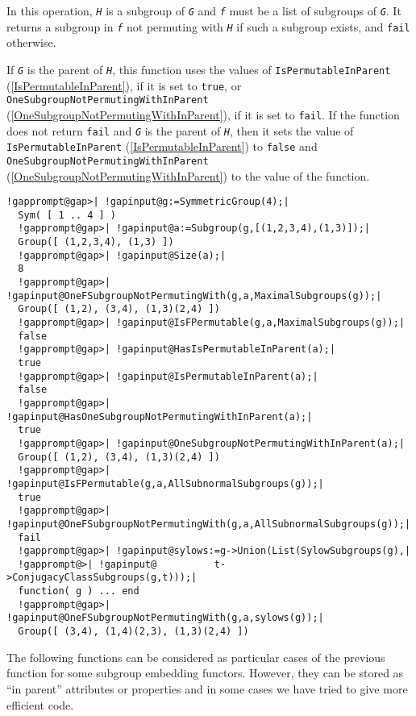 \documentclass[a4paper,11pt]{report}
\begin{document}
{{{ In this operation, \mbox{\texttt{\mdseries\slshape H}} is a subgroup of \mbox{\texttt{\mdseries\slshape G}} and \mbox{\texttt{\mdseries\slshape f}} must be a list of subgroups of \mbox{\texttt{\mdseries\slshape G}}. It returns a subgroup in \mbox{\texttt{\mdseries\slshape f}} not permuting with \mbox{\texttt{\mdseries\slshape H}} if such a subgroup exists, and \texttt{fail} otherwise. 

 If \mbox{\texttt{\mdseries\slshape G}} is the parent of \mbox{\texttt{\mdseries\slshape H}}, this function uses the values of \texttt{IsPermutableInParent} (\ref{IsPermutableInParent}), if it is set to \texttt{true}, or \texttt{OneSubgroupNotPermutingWithInParent} (\ref{OneSubgroupNotPermutingWithInParent}), if it is set to \texttt{fail}. If the function does not return \texttt{fail} and \mbox{\texttt{\mdseries\slshape G}} is the parent of \mbox{\texttt{\mdseries\slshape H}}, then it sets the value of \texttt{IsPermutableInParent} (\ref{IsPermutableInParent}) to \texttt{false} and \texttt{OneSubgroupNotPermutingWithInParent} (\ref{OneSubgroupNotPermutingWithInParent}) to the value of the function. 

 
\begin{Verbatim}[commandchars=!@|,fontsize=\small,frame=single,label=Example]
  !gapprompt@gap>| !gapinput@g:=SymmetricGroup(4);|
  Sym( [ 1 .. 4 ] )
  !gapprompt@gap>| !gapinput@a:=Subgroup(g,[(1,2,3,4),(1,3)]);|
  Group([ (1,2,3,4), (1,3) ])
  !gapprompt@gap>| !gapinput@Size(a);|
  8
  !gapprompt@gap>| !gapinput@OneFSubgroupNotPermutingWith(g,a,MaximalSubgroups(g));|
  Group([ (1,2), (3,4), (1,3)(2,4) ])
  !gapprompt@gap>| !gapinput@IsFPermutable(g,a,MaximalSubgroups(g));|
  false
  !gapprompt@gap>| !gapinput@HasIsPermutableInParent(a);|
  true
  !gapprompt@gap>| !gapinput@IsPermutableInParent(a);|
  false
  !gapprompt@gap>| !gapinput@HasOneSubgroupNotPermutingWithInParent(a);|
  true
  !gapprompt@gap>| !gapinput@OneSubgroupNotPermutingWithInParent(a);|
  Group([ (1,2), (3,4), (1,3)(2,4) ])
  !gapprompt@gap>| !gapinput@IsFPermutable(g,a,AllSubnormalSubgroups(g));|
  true
  !gapprompt@gap>| !gapinput@OneFSubgroupNotPermutingWith(g,a,AllSubnormalSubgroups(g));|
  fail
  !gapprompt@gap>| !gapinput@sylows:=g->Union(List(SylowSubgroups(g),|
  !gapprompt@>| !gapinput@          t->ConjugacyClassSubgroups(g,t)));|
  function( g ) ... end
  !gapprompt@gap>| !gapinput@OneFSubgroupNotPermutingWith(g,a,sylows(g));|
  Group([ (3,4), (1,4)(2,3), (1,3)(2,4) ])
\end{Verbatim}
 }

 The following functions can be considered as particular cases of the previous
function for some subgroup embedding functors. However, they can be stored as ``in parent'' attributes or properties and in some cases we have tried to give more
efficient code. 

}}
\end{document}

